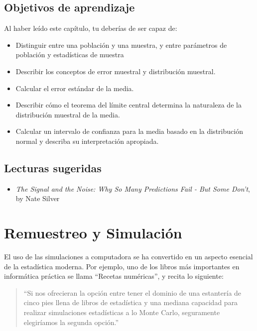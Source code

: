 \documentclass[
  12pt,
]{book}
\providecommand{\tightlist}{%
  \setlength{\itemsep}{0pt}\setlength{\parskip}{0pt}}
\begin{document}
\hypertarget{objetivos-de-aprendizaje-6}{%
\section{Objetivos de aprendizaje}\label{objetivos-de-aprendizaje-6}}

Al haber leído este capítulo, tu deberías de ser capaz de:

\begin{itemize}
\tightlist
\item
  Distinguir entre una población y una muestra, y entre parámetros de población y estadísticas de muestra
\item
  Describir los conceptos de error muestral y distribución muestral.
\item
  Calcular el error estándar de la media.
\item
  Describir cómo el teorema del límite central determina la naturaleza de la distribución muestral de la media.
\item
  Calcular un intervalo de confianza para la media basado en la distribución normal y describa su interpretación apropiada.
\end{itemize}

\hypertarget{lecturas-sugeridas-4}{%
\section{Lecturas sugeridas}\label{lecturas-sugeridas-4}}

\begin{itemize}
\tightlist
\item
  \emph{The Signal and the Noise: Why So Many Predictions Fail - But Some Don't}, by Nate Silver
\end{itemize}

\hypertarget{resampling-and-simulation}{%
\chapter{Remuestreo y Simulación}\label{resampling-and-simulation}}

El uso de las simulaciones a computadora se ha convertido en un aspecto esencial de la estadística moderna. Por ejemplo, uno de los libros más importantes en informática práctica se llama ``Recetas numéricas'', y recita lo siguiente:

\begin{quote}
``Si nos ofrecieran la opción entre tener el dominio de una estantería de cinco pies llena de libros de estadística y una mediana capacidad para realizar simulaciones estadísticas a lo Monte Carlo, seguramente elegiríamos la segunda opción.''
\end{quote}
\end{document}
